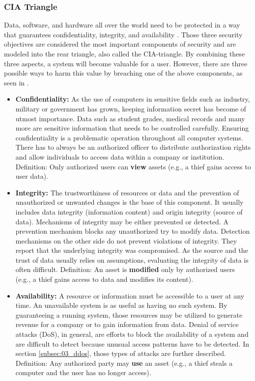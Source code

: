 \subsubsection{CIA Triangle}
Data, software, and hardware all over the world need to be protected in a way that guarantees confidentiality, integrity, and availability \cite{Pfleeger2014}. Those three security objectives are considered the most important components of security and are modeled into the rear triangle, also called the CIA-triangle. By combining these three aspects, a system will become valuable for a user. However, there are three possible ways to harm this value by breaching one of the above components, as seen in \cite{Bishop2004}.
\begin{itemize}
  \item \textbf{Confidentiality:} As the use of computers in sensitive fields such as industry, military or government has grown, keeping information secret has become of utmost importance. Data such as student grades, medical records and many more are sensitive information that needs to be controlled carefully. Ensuring confidentiality is a problematic operation throughout all computer systems. There has to always be an authorized officer to distribute  authorization rights and allow individuals to access data within a company or institution.
        \subitem Definition: Only authorized users can \textbf{view} assets (e.g., a thief gains access to user data).
  \item \textbf{Integrity:} The trustworthiness of resources or data and the prevention of unauthorized or unwanted changes is the base of this component. It usually includes data integrity (information content) and origin integrity (source of data). Mechanisms of integrity may be either prevented or detected. A prevention mechanism blocks any unauthorized try to modify data. Detection mechanisms on the other side do not prevent violations of integrity. They report that the underlying integrity was compromised. As the source and the trust of data usually relies on assumptions, evaluating the integrity of data is often difficult.
        \subitem Definition: An asset is \textbf{modified} only by authorized users (e.g., a thief gains access to data and modifies its content).
  \item \textbf{Availability:} A resource or information must be accessible to a user at any time. An unavailable system is as useful as having no such system. By guaranteeing a running system, those resources may be utilized to generate revenue for a company or to gain information from data. Denial of service attacks (DoS), in general, are efforts to block the availability of a system and are difficult to detect because unusual access patterns have to be detected. In section \ref{subsec:03_ddos}, those types of attacks are further described.
        \subitem Definition: Any authorized party may \textbf{use} an asset (e.g., a thief steals a computer and the user has no longer access).
\end{itemize}

